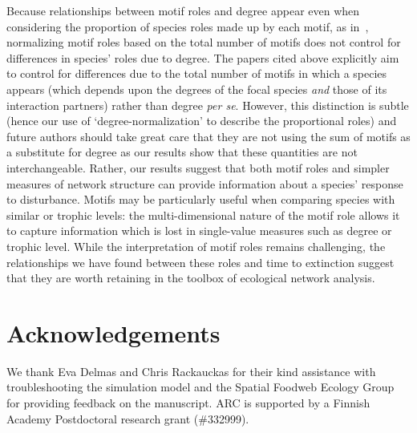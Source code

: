 \documentclass[12pt]{article}
\begin{document}
\begin{spacing}{2.0}
        
	    Because relationships between motif roles and degree appear even when considering the proportion of species roles made up by each motif, as in~\citet{Baker2015,Cirtwill2015,Simmons2019}, normalizing motif roles based on the total number of motifs does not control for differences in species' roles due to degree.
	    The papers cited above explicitly aim to control for differences due to the total number of motifs in which a species appears (which depends upon the degrees of the focal species \emph{and} those of its interaction partners) rather than degree \emph{per se}.
	    However, this distinction is subtle (hence our use of `degree-normalization' to describe the proportional roles) and future authors should take great care that they are not using the sum of motifs as a substitute for degree as our results show that these quantities are not interchangeable.
        Rather, our results suggest that both motif roles and simpler measures of network structure can provide information about a species' response to disturbance.
        Motifs may be particularly useful when comparing species with similar  or trophic levels: the multi-dimensional nature of the motif role allows it to capture information which is lost in single-value measures such as degree or trophic level.
        While the interpretation of motif roles remains challenging, the relationships we have found between these roles and time to extinction suggest that they are worth retaining in the toolbox of ecological network analysis.
        

\section*{Acknowledgements}

	We thank Eva Delmas and Chris Rackauckas for their kind assistance with troubleshooting the simulation model and the Spatial Foodweb Ecology Group for providing feedback on the manuscript. ARC is supported by a Finnish Academy Postdoctoral research grant (\#332999). 


\clearpage
     

\clearpage
\end{spacing}
\end{document}
